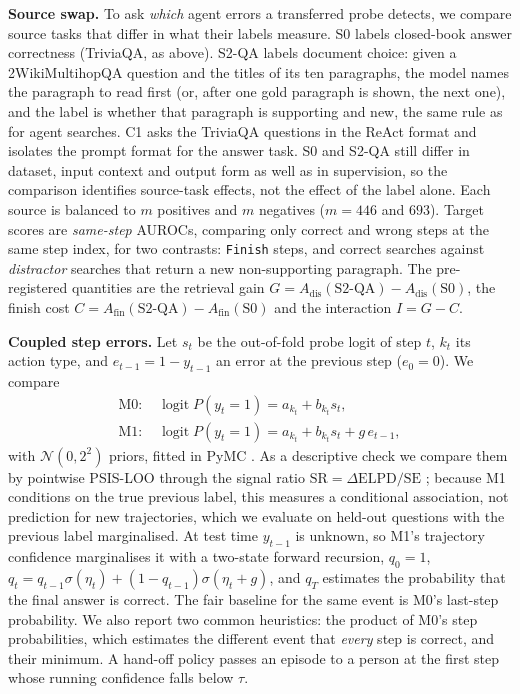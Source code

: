 \documentclass[11pt]{article}
\newcommand{\finish}{\texttt{Finish}}
\begin{document}
\textbf{Source swap.} To ask \emph{which} agent errors a transferred probe detects, we compare source tasks that
differ in what their labels measure. S0 labels closed-book answer correctness (TriviaQA, as above). S2-QA labels document choice: given a
2WikiMultihopQA question \citep{ho2020constructing} and the titles of its ten paragraphs, the model names the
paragraph to read first (or, after one gold paragraph is shown, the next one), and the label is whether that
paragraph is supporting and new, the same rule as for agent searches. C1 asks the TriviaQA questions in the ReAct
format and isolates the prompt format for the answer task. S0 and S2-QA still differ in dataset, input context and
output form as well as in supervision, so the comparison identifies source-task effects, not the effect of the
label alone. Each source is balanced to $m$ positives and $m$ negatives
($m=446$ and $693$). Target scores are \emph{same-step} AUROCs, comparing only correct and wrong steps at the same
step index, for two contrasts: \finish{} steps, and correct searches against \emph{distractor} searches that
return a new non-supporting paragraph. The pre-registered quantities are the retrieval gain
$G=A_\text{dis}(\text{S2-QA})-A_\text{dis}(\text{S0})$, the finish cost
$C=A_\text{fin}(\text{S2-QA})-A_\text{fin}(\text{S0})$ and the interaction $I=G-C$.

\textbf{Coupled step errors.} Let $s_t$ be the out-of-fold probe logit of step $t$, $k_t$ its action type, and
$e_{t-1}=1-y_{t-1}$ an error at the previous step ($e_0=0$). We compare
\begin{align*}
\text{M0: } & \operatorname{logit} P(y_t=1) = a_{k_t} + b_{k_t} s_t,\\
\text{M1: } & \operatorname{logit} P(y_t=1) = a_{k_t} + b_{k_t} s_t + g\, e_{t-1},
\end{align*}
with $\mathcal{N}(0,2^2)$ priors, fitted in PyMC \citep{abrilpla2023pymc}. As a descriptive check we compare
them by pointwise PSIS-LOO \citep{vehtari2017practical} through the signal ratio
$\mathrm{SR}=\Delta\mathrm{ELPD}/\mathrm{SE}$ \citep{shi2026bayesian}; because M1 conditions on the true previous
label, this measures a conditional association, not prediction for new trajectories, which we evaluate on
held-out questions with the previous label marginalised. At test time $y_{t-1}$ is unknown, so M1's trajectory confidence marginalises it with a
two-state forward recursion, $q_0=1$, $q_t = q_{t-1}\sigma(\eta_t) + (1-q_{t-1})\sigma(\eta_t+g)$, and $q_T$
estimates the probability that the final answer is correct. The fair baseline for the same event is M0's last-step
probability. We also report two common heuristics: the product of M0's step probabilities, which estimates the
different event that \emph{every} step is correct, and their minimum. A hand-off policy passes an episode to a person at the first step whose
running confidence falls below $\tau$.
\end{document}
